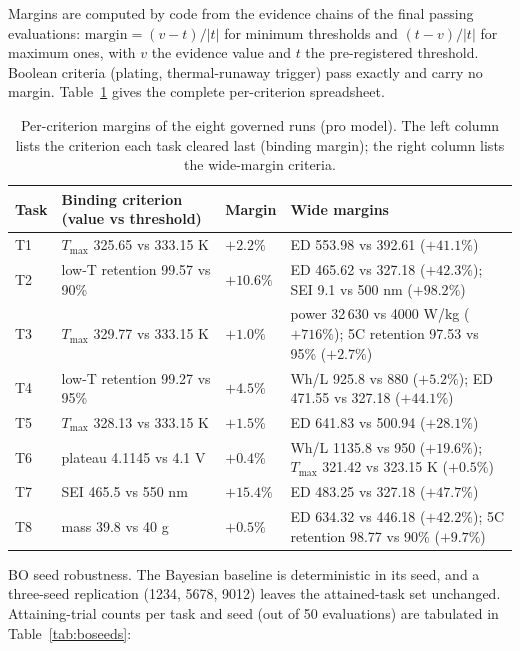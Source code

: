 \documentclass[review,11pt]{elsarticle}
\begin{document}
Margins are computed by code from the evidence chains of the final
passing evaluations: $\text{margin} = (v - t)/|t|$ for minimum thresholds
and $(t - v)/|t|$ for maximum ones, with $v$ the evidence value and $t$ the
pre-registered threshold. Boolean criteria (plating, thermal-runaway
trigger) pass exactly and carry no margin. Table~\ref{tab:margins}
gives the complete per-criterion spreadsheet.

\begin{table}[!ht]
\centering
\caption{Per-criterion margins of the eight governed runs (pro model).
The left column lists the criterion each task cleared last (binding
margin); the right column lists the wide-margin criteria.}
\label{tab:margins}
\begin{tabular}{p{1.0cm}p{4.9cm}p{1.5cm}p{3.8cm}}
\toprule
Task & Binding criterion (value vs threshold) & Margin & Wide margins \\
\midrule
T1 & $T_{\max}$ 325.65 vs 333.15 K & $+2.2\%$ & ED 553.98 vs 392.61 ($+41.1\%$) \\
T2 & low-T retention 99.57 vs 90\% & $+10.6\%$ & ED 465.62 vs 327.18 ($+42.3\%$); SEI 9.1 vs 500 nm ($+98.2\%$) \\
T3 & $T_{\max}$ 329.77 vs 333.15 K & $+1.0\%$ & power 32\,630 vs 4000 W/kg ($+716\%$); 5C retention 97.53 vs 95\% ($+2.7\%$) \\
T4 & low-T retention 99.27 vs 95\% & $+4.5\%$ & Wh/L 925.8 vs 880 ($+5.2\%$); ED 471.55 vs 327.18 ($+44.1\%$) \\
T5 & $T_{\max}$ 328.13 vs 333.15 K & $+1.5\%$ & ED 641.83 vs 500.94 ($+28.1\%$) \\
T6 & plateau 4.1145 vs 4.1 V & $+0.4\%$ & Wh/L 1135.8 vs 950 ($+19.6\%$); $T_{\max}$ 321.42 vs 323.15 K ($+0.5\%$) \\
T7 & SEI 465.5 vs 550 nm & $+15.4\%$ & ED 483.25 vs 327.18 ($+47.7\%$) \\
T8 & mass 39.8 vs 40 g & $+0.5\%$ & ED 634.32 vs 446.18 ($+42.2\%$); 5C retention 98.77 vs 90\% ($+9.7\%$) \\
\bottomrule
\end{tabular}
\end{table}

BO seed robustness. The Bayesian baseline is deterministic in its seed, and
a three-seed replication (1234, 5678, 9012) leaves the attained-task set
unchanged. Attaining-trial counts per task and seed (out of 50
evaluations) are tabulated in Table~\ref{tab:boseeds}:
\end{document}

